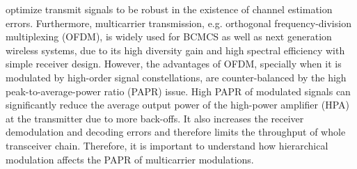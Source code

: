 \documentclass[conference]{IEEEtran}
\begin{document}
optimize transmit signals to be robust in the existence of channel
estimation errors. Furthermore, multicarrier transmission, e.g.
orthogonal frequency-division multiplexing (OFDM), is widely used
for BCMCS as well as next generation wireless systems, due to its
high diversity gain and high spectral efficiency with simple
receiver design. However, the advantages of OFDM, specially when
it is modulated by high-order signal constellations, are
counter-balanced by the high peak-to-average-power ratio (PAPR)
issue. High PAPR of modulated signals can significantly reduce the
average output power of the high-power amplifier (HPA) at the
transmitter due to more back-offs. It also increases the receiver
demodulation and decoding errors and therefore limits the
throughput of whole transceiver chain. Therefore, it is important
to understand how hierarchical modulation affects the PAPR of
multicarrier modulations.
\end{document}
